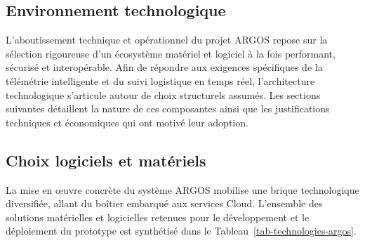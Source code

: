 \subsection{Environnement technologique}

L'aboutissement technique et opérationnel du projet ARGOS repose sur la sélection rigoureuse d'un écosystème matériel et logiciel à la fois performant, sécurisé et interopérable. Afin de répondre aux exigences spécifiques de la télémétrie intelligente et du suivi logistique en temps réel, l'architecture technologique s'articule autour de choix structurels assumés. Les sections suivantes détaillent la nature de ces composantes ainsi que les justifications techniques et économiques qui ont motivé leur adoption.

\subsection{Choix logiciels et matériels}

La mise en œuvre concrète du système ARGOS mobilise une brique technologique diversifiée, allant du boîtier embarqué aux services Cloud. L'ensemble des solutions matérielles et logicielles retenues pour le développement et le déploiement du prototype est synthétisé dans le Tableau~\ref{tab-technologies-argos}.

